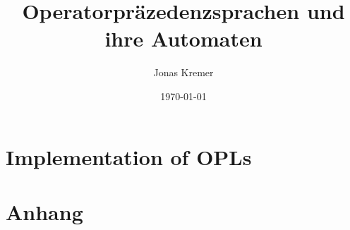\documentclass[11pt]{article}
\author{Jonas Kremer}
\title{Operatorpräzedenzsprachen und ihre Automaten}
\date{\today{}}
\theoremstyle{remark}
\begin{document}
\maketitle
\newpage
\setcounter{tocdepth}{2}
\tableofcontents
\newpage








\section{Implementation of OPLs}



\appendix

\section*{Anhang}


\end{document}
